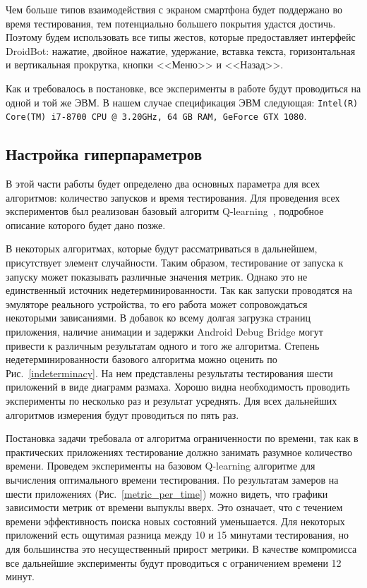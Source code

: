Чем больше типов взаимодействия с экраном смартфона будет поддержано во время тестирования, тем потенциально большего покрытия удастся достичь. Поэтому будем использовать все типы жестов, которые предоставляет интерфейс DroidBot: нажатие, двойное нажатие, удержание, вставка текста, горизонтальная и вертикальная прокрутка, кнопки <<Меню>> и <<Назад>>.

Как и требовалось в постановке, все эксперименты в работе будут проводиться на одной и той же ЭВМ. В нашем случае спецификация ЭВМ следующая: \texttt{Intel(R) Core(TM) i7-8700 CPU @ 3.20GHz, 64 GB RAM, GeForce GTX 1080}.

\subsection{Настройка гиперпараметров}

В этой части работы будет определено два основных параметра для всех алгоритмов: количество запусков и время тестирования. Для проведения всех экспериментов был реализован базовый алгоритм Q-learning~\cite{adamo2018reinforcement}, подробное описание которого будет дано позже.

В некоторых алгоритмах, которые будут рассматриваться в дальнейшем, присутствует элемент случайности. Таким образом, тестирование от запуска к запуску может показывать различные значения метрик. Однако это не единственный источник недетерминированности. Так как запуски проводятся на эмуляторе реального устройства, то его работа может сопровождаться некоторыми зависаниями. В добавок ко всему долгая загрузка страниц приложения, наличие анимации и задержки Android Debug Bridge могут привести к различным результатам одного и того же алгоритма. Степень недетерминированности базового алгоритма можно оценить по Рис.~\ref{indeterminacy}. На нем представлены результаты тестирования шести приложений в виде диаграмм размаха. Хорошо видна необходимость проводить эксперименты по несколько раз и результат усреднять. Для всех дальнейших алгоритмов измерения будут проводиться по пять раз. 

Постановка задачи требовала от алгоритма ограниченности по времени, так как в практических приложениях тестирование должно занимать разумное количество времени. Проведем эксперименты на базовом Q-learning алгоритме для вычисления оптимального времени тестирования. По результатам замеров на шести приложениях (Рис.~\ref{metric_per_time}) можно видеть, что графики зависимости метрик от времени выпуклы вверх. Это означает, что с течением времени эффективность поиска новых состояний уменьшается. Для некоторых приложений есть ощутимая разница между 10 и 15 минутами тестирования, но для большинства это несущественный прирост метрики. В качестве компромисса все дальнейшие эксперименты будут проводиться с ограничением времени 12 минут.

